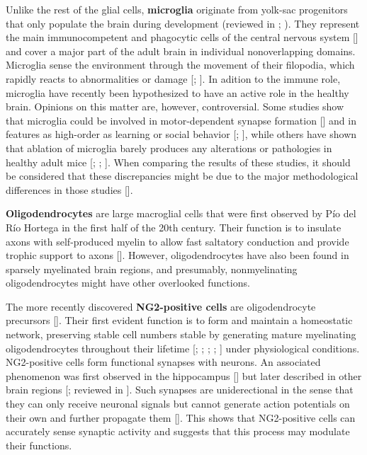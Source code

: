 Unlike the rest of the glial cells, \textbf{microglia} originate from yolk-sac progenitors that only populate the brain during development (reviewed in \cite{kim2005microglia}; \cite{kettenmann2011physiology}).
They represent the main immunocompetent and phagocytic cells of the central nervous system [\cite{filiano2015interactions}] and cover a major part of the adult brain in individual nonoverlapping domains.
Microglia sense the environment through the movement of their filopodia, which rapidly reacts to abnormalities or damage [\cite{nimmerjahn2005resting}; \cite{cronk2013microglia}].
In adition to the immune role, microglia have recently been hypothesized to have an active role in the healthy brain. 
Opinions on this matter are, however, controversial. 
Some studies show that microglia could be involved in motor-dependent synapse formation [\cite{parkhurst2013microglia}] and in features as high-order as learning or social behavior [\cite{torres2016dynamic}; \cite{kierdorf2017microglia}], while others have shown that ablation of microglia barely produces any alterations or pathologies in healthy adult mice [\cite{elmore2014colony}; \cite{elmore2015characterizing}; \cite{bruttger2015genetic}].
When comparing the results of these studies, it should be considered that these discrepancies might be due to the major methodological differences in those studies [\cite{jakel2017glial}].

\textbf{Oligodendrocytes} are large macroglial cells that were first observed by Pío del Río Hortega in the first half of the 20th century. 
Their function is to insulate axons with self-produced myelin to allow fast saltatory conduction and provide trophic support to axons [\cite{nave2010myelination}].
However, oligodendrocytes have also been found in sparsely myelinated brain regions, and presumably, nonmyelinating oligodendrocytes might have other overlooked functions.

The more recently discovered \textbf{NG2-positive cells} are oligodendrocyte precursors [\cite{raff1986proliferating}].
Their first evident function is to form and maintain a homeostatic network, preserving stable cell numbers stable by generating mature myelinating oligodendrocytes throughout their lifetime [\cite{dimou2008progeny}; \cite{rivers2008pdgfra}; \cite{psachoulia2009cell}; \cite{simon2011progenitors}; \cite{hughes2013oligodendrocyte}] under physiological conditions.
NG2-positive cells form functional synapses with neurons.
An associated phenomenon was first observed in the hippocampus [\cite{bergles2000glutamatergic}] but later described in other brain regions [\cite{karadottir2005nmda}; reviewed in \cite{sun2013synaptic}].
Such synapses are uniderectional in the sense that they can only receive neuronal signals but cannot generate action potentials on their own and further propagate them [\cite{de2010excitability}]. 
This shows that NG2-positive cells can accurately sense synaptic activity and suggests that this process may modulate their functions.

